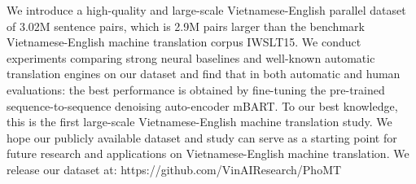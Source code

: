 We introduce a high-quality and large-scale Vietnamese-English parallel dataset of 3.02M sentence pairs, which is 2.9M pairs larger than the benchmark Vietnamese-English machine translation corpus IWSLT15. We conduct experiments comparing strong neural baselines and well-known automatic translation engines on our dataset and find that in both automatic and human evaluations: the best performance is obtained by fine-tuning the pre-trained sequence-to-sequence denoising auto-encoder mBART. To our best knowledge, this is the first large-scale Vietnamese-English machine translation study. We hope our publicly available dataset and study can serve as a starting point for future research and applications on Vietnamese-English machine translation. We release our dataset at: https://github.com/VinAIResearch/PhoMT
